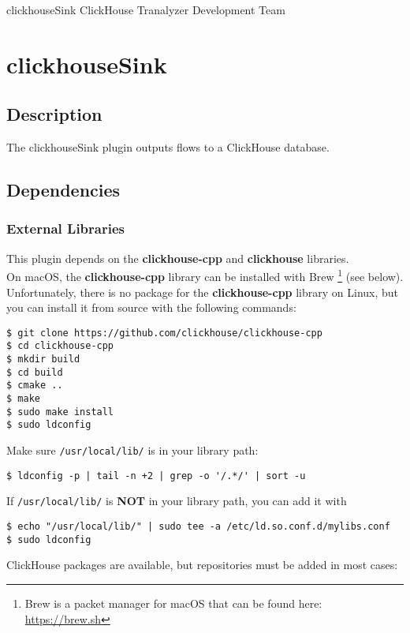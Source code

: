 \documentclass[documentation]{subfiles}
\begin{document}
\trantitle
    {clickhouseSink} %
    {ClickHouse} %
    {Tranalyzer Development Team} %

\section{clickhouseSink}\label{s:clickhouseSink}

\subsection{Description}
The clickhouseSink plugin outputs flows to a ClickHouse database.

\subsection{Dependencies}

\subsubsection{External Libraries}
This plugin depends on the {\bf clickhouse-cpp} and {\bf clickhouse} libraries.\\

On macOS, the {\bf clickhouse-cpp} library can be installed with Brew%
\footnote{Brew is a packet manager for macOS that can be found here: \url{https://brew.sh}} (see below).
Unfortunately, there is no package for the {\bf clickhouse-cpp} library on Linux, but
you can install it from source with the following commands:

\begin{verbatim}
$ git clone https://github.com/clickhouse/clickhouse-cpp
$ cd clickhouse-cpp
$ mkdir build
$ cd build
$ cmake ..
$ make
$ sudo make install
$ sudo ldconfig
\end{verbatim}
Make sure {\tt /usr/local/lib/} is in your library path:
\begin{verbatim}
$ ldconfig -p | tail -n +2 | grep -o '/.*/' | sort -u
\end{verbatim}
If {\tt /usr/local/lib/} is {\bf NOT} in your library path, you can add it with
\begin{verbatim}
$ echo "/usr/local/lib/" | sudo tee -a /etc/ld.so.conf.d/mylibs.conf
$ sudo ldconfig
\end{verbatim}

ClickHouse packages are available, but repositories must be added in most cases:
\end{document}
